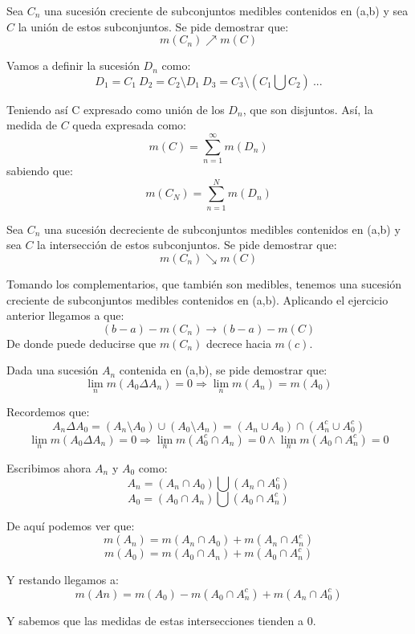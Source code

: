 \begin{problem}[11]
Sea $C_n$ una sucesión creciente de subconjuntos medibles contenidos en (a,b) y sea $C$ la unión de estos subconjuntos. Se pide demostrar que:
\[m(C_n) \nearrow m(C)\]

\solution
Vamos a definir la sucesión $D_n$ como:
\[D_1=C_1 \ D_2 = C_2 \setminus D_1 \ D_3 = C_3 \setminus (C_1 \bigcup C_2) \ ...\]

Teniendo así C expresado como unión de los $D_n$, que son disjuntos. Así, la medida de $C$ queda expresada como:
\[m(C)=\sum_{n=1}^{\infty}m(D_n)\]
sabiendo que:
\[m(C_N)=\sum_{n=1}^{N}m(D_n)\]
\end{problem}

\begin{problem}[12]
Sea $C_n$ una sucesión decreciente de subconjuntos medibles contenidos en (a,b) y sea $C$ la intersección de estos subconjuntos. Se pide demostrar que:
\[m(C_n) \searrow m(C)\]
\solution

Tomando los complementarios, que también son medibles, tenemos una sucesión creciente de subconjuntos medibles contenidos en (a,b). Aplicando el ejercicio anterior llegamos a que:
\[(b-a)-m(C_n) \rightarrow (b-a)-m(C)\]
De donde puede deducirse que $m(C_n)$ decrece hacia $m(c)$.
\end{problem}

\begin{problem}[14]
Dada una sucesión $A_n$ contenida en (a,b), se pide demostrar que:
\[\lim_n m(A_0\Delta A_n)=0 \Rightarrow \lim_n m(A_n)=m(A_0) \]

Recordemos que:
\[ A_n \Delta A_0 = (A_n \setminus A_0) \cup (A_0 \setminus A_n) =
(A_n \cup A_0)\cap(A_n^c \cup A_0^c) \]
\solution
\[\lim_n m(A_0\Delta A_n)=0 \Rightarrow \lim_n m(A_0^c \cap A_n)=0 \wedge \lim_n m(A_0\cap A_n^c)=0\]

Escribimos ahora $A_n$ y $A_0$ como:
\[A_n = (A_n \cap A_0) \bigcup (A_n \cap A_0^c)\]
\[A_0 = (A_0 \cap A_n) \bigcup (A_0 \cap A_n^c)\]

De aquí podemos ver que:
\[m(A_n) = m(A_n \cap A_0) + m(A_n \cap A_n^c)\]
\[m(A_0) = m(A_0 \cap A_n) + m(A_0 \cap A_n^c)\]

Y restando llegamos a:
\[m(An) = m(A_0) -m(A_0 \cap A_n^c) + m(A_n \cap A_0^c)\]

Y sabemos que las medidas de estas intersecciones tienden a 0.
\end{problem}

